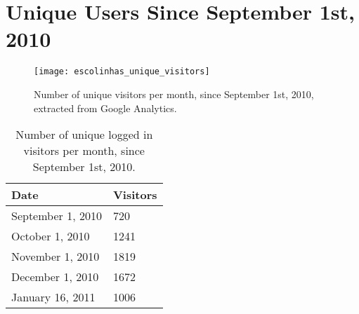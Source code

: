 \chapter{Unique Users Since September 1st, 2010}\label{appendix:unique_visitors}

\begin{figure}[H]
  \texttt{[image: escolinhas\_unique\_visitors]}
  \caption[Number of unique visitors per month, since September 1st, 2010]{Number of unique visitors per month, since September 1st, 2010, extracted from Google Analytics.}
  \label{fig:unique_visitors}
\end{figure}

\begin{table}
  \begin{center}
    \begin{tabular}{|l|l|}
      \hline
      \textbf{Date}     & \textbf{Visitors} \\
      \hline
      September 1, 2010 & 720  \\ \hline
      October 1, 2010   & 1241 \\ \hline
      November 1, 2010  & 1819 \\ \hline
      December 1, 2010  & 1672 \\ \hline
      January 16, 2011  & 1006 \\
      \hline
    \end{tabular}
    \caption{Number of unique logged in visitors per month, since September 1st, 2010.}
    \label{table:unique_visitors}
  \end{center}
\end{table}

\vspace{10cm}

